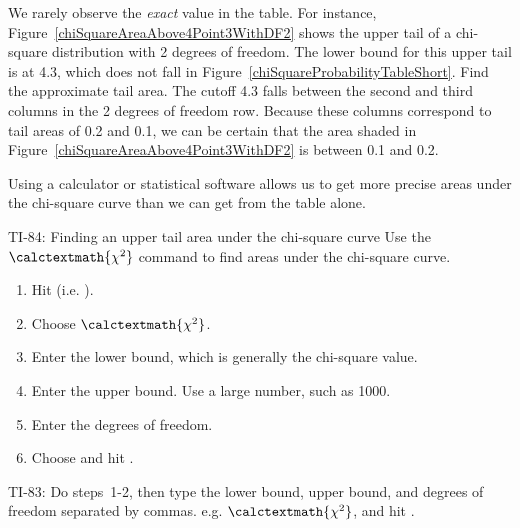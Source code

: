\begin{examplewrap}
\begin{nexample}{We rarely observe the \emph{exact} value in the table. For instance, Figure~\ref{chiSquareAreaAbove4Point3WithDF2} shows the upper tail of a chi-square distribution with 2 degrees of freedom. The lower bound for this upper tail is at 4.3, which does not fall in Figure~\ref{chiSquareProbabilityTableShort}. Find the approximate tail area.}
The cutoff 4.3 falls between the second and third columns in the 2 degrees of freedom row. Because these columns correspond to tail areas of 0.2 and 0.1, we can be certain that the area shaded in Figure~\ref{chiSquareAreaAbove4Point3WithDF2} is between 0.1 and 0.2.
\end{nexample}
\end{examplewrap}



Using a calculator or statistical software allows us to get more precise areas under the chi-square curve than we can get from the table alone.

\begin{onebox}{ TI-84: Finding an upper tail area under the chi-square curve}
\label{chisqtail}
Use the $\calctextmath{\chi^2}$ command to find areas under the chi-square curve.
\begin{enumerate}
\setlength{\itemsep}{0mm}
\item Hit   (i.e. ).
\item Choose $\calctextmath{\chi^2}$.
\item Enter the lower bound, which is generally the chi-square value.
\item Enter the upper bound. Use a large number, such as 1000.
\item Enter the degrees of freedom.
\item Choose  and hit .
\end{enumerate}
TI-83: Do steps~1-2, then type the lower bound, upper bound, and degrees of freedom separated by commas. e.g. $\calctextmath{\chi^2}$, and hit .\end{onebox}

